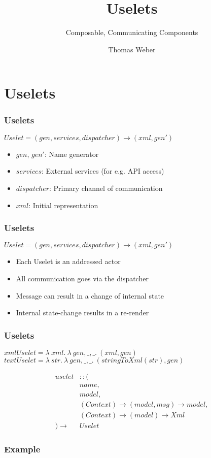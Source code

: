\documentclass{beamer}
\title{Uselets}
\subtitle{Composable, Communicating Components}
\author{Thomas Weber}
\begin{document}
  \frame{\titlepage}
  \section{Uselets}
  \begin{frame}
    \frametitle{Uselets}
	\vspace{14px}
    $Uselet = (gen, services, dispatcher) \rightarrow (xml, gen')$
    \begin{itemize}
      \item $gen$, $gen'$: Name generator
      \item $services$: External services (for e.g. API access)
      \item $dispatcher$: Primary channel of communication
      \item $xml$: Initial representation 
    \end{itemize}
  \end{frame}
  \begin{frame}
    \frametitle{Uselets}
	\vspace{14px}
    $Uselet = (gen, services, dispatcher) \rightarrow (xml, gen')$
    \begin{itemize}
      \item Each Uselet is an addressed actor
      \item All communication goes via the dispatcher
      \item Message can result in a change of internal state
      \item Internal state-change results in a re-render
    \end{itemize}
  \end{frame}
  \begin{frame}
    \frametitle{Uselets}

    $xmlUselet = \lambda\ xml.\ \lambda\ gen, \_, \_.\ (xml, gen)$
    $textUselet = \lambda\ str.\ \lambda\ gen, \_, \_.\ (stringToXml(str), gen)$

    \begin{align*}
    uselet&:: (\\
    &name,\\
    &model,\\
    &(Context) \rightarrow (model, msg) \rightarrow model,\\
    &(Context) \rightarrow (model) \rightarrow Xml\\
    ) \rightarrow&Uselet
    \end{align*}
  \end{frame}
  \begin{frame}
    \frametitle{Example}

      

  \end{frame}
\end{document}
